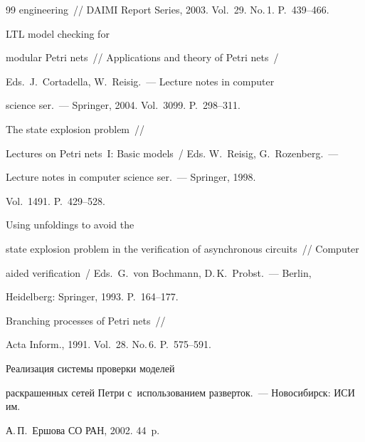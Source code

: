 {{\begin{thebibliography}{99}
engineering~/\!\!/ DAIMI Report Series, 2003. Vol.~29. No.\,1. P.~439--466.


    






LTL model checking for 


modular Petri nets~/\!\!/ Applications and theory of Petri nets~/


Eds.\ J.~Cortadella, W.~Reisig.~--- Lecture notes in computer 


science ser.~--- Springer, 2004. Vol.~3099. P.~298--311.


    




 The state explosion problem~/\!\!/ 


Lectures on Petri nets~I: Basic models~/ Eds. W.~Reisig, G.~Rozenberg.~--- 


Lecture notes in computer science ser.~--- Springer, 1998. 


Vol.~1491. P.~429--528.


    




 Using unfoldings to avoid the 


state explosion problem in the verification of asynchronous circuits~/\!\!/ Computer 


aided verification~/ Eds.\ G.~von Bochmann, D.\,K.~Probst.~--- Berlin, 


Heidelberg: Springer, 1993. P.~164--177.






Branching processes of Petri nets~/\!\!/ 


Acta Inform., 1991. Vol.~28. No.\,6. P.~575--591.







 Реализация сис\-те\-мы проверки моделей 


рас\-кра\-шен\-ных сетей Пет\-ри с~использованием разверток.~--- Новосибирск: ИСИ им.\ 


А.\,П.~Ершова СО РАН, 2002. 44~p.


       \end{thebibliography}


} }











